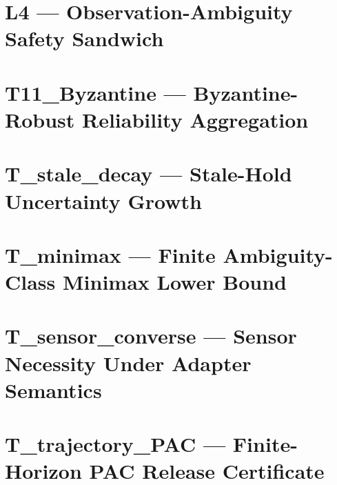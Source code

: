 \section{L4 --- Observation-Ambiguity Safety Sandwich}\label{sec:proof-L4}


\section{T11\_Byzantine --- Byzantine-Robust Reliability Aggregation}
\label{sec:proof-T11-byz}


\section{T\_stale\_decay --- Stale-Hold Uncertainty Growth}
\label{sec:proof-T-stale}


\section{T\_minimax --- Finite Ambiguity-Class Minimax Lower Bound}
\label{sec:proof-T-minimax}


\section{T\_sensor\_converse --- Sensor Necessity Under Adapter Semantics}
\label{sec:proof-T-sensor}


\section{T\_trajectory\_PAC --- Finite-Horizon PAC Release Certificate}
\label{sec:proof-T-trajectory-PAC}


